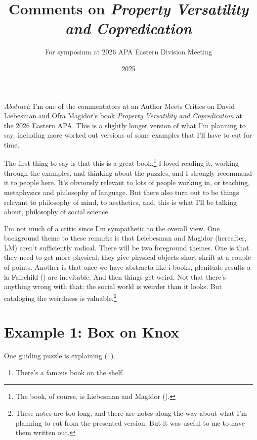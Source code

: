 \documentclass[
  11pt,
  letterpaper,
  DIV=11,
  numbers=noendperiod,
  twoside]{scrartcl}
\title{Comments on \emph{Property Versatility and Copredication}}
\subtitle{For symposium at 2026 APA Eastern Division Meeting}
\author{}
\date{2025}
\providecommand{\tightlist}{%
  \setlength{\itemsep}{0pt}\setlength{\parskip}{0pt}}
\renewenvironment{abstract}
 {\vspace{-1.25cm}
 \quotation\small\noindent\emph{Abstract}:}
 {\endquotation}
\renewenvironment{abstract}
 {\quotation\small\noindent\emph{Abstract}:}
 {\endquotation\vspace{-0.02cm}}
\begin{document}
\maketitle
\begin{abstract}
I'm one of the commentators at an Author Meets Critics on David
Liebesman and Ofra Magidor's book \emph{Property Versatility and
Copredication} at the 2026 Eastern APA. This is a slightly longer
version of what I'm planning to say, including more worked out versions
of some examples that I'll have to cut for time.
\end{abstract}


The first thing to say is that this is a great book.\footnote{The book,
  of course, is Liebesman and Magidor ().} I
loved reading it, working through the examples, and thinking about the
puzzles, and I strongly recommend it to people here. It's obviously
relevant to lots of people working in, or teaching, metaphysics and
philosophy of language. But there also turn out to be things relevant to
philosophy of mind, to aesthetics, and, this is what I'll be talking
about, philosophy of social science.

I'm not much of a critic since I'm sympathetic to the overall view. One
background theme to these remarks is that Leiebesman and Magidor
(hereafter, LM) aren't sufficiently radical. There will be two
foreground themes. One is that they need to get more physical; they give
physical objects short shrift at a couple of points. Another is that
once we have abstracta like i-books, plenitude results a la Fairchild
() are inevitable. And then things get
weird. Not that there's anything wrong with that; the social world is
weirder than it looks. But cataloging the weirdness is
valuable.\footnote{These notes are too long, and there are notes along
  the way about what I'm planning to cut from the presented version. But
  it was useful to me to have them written out.}

\section{Example 1: Box on Knox}\label{example-1-box-on-knox}

One guiding puzzle is explaining (1).

\begin{enumerate}
\def\labelenumi{(\arabic{enumi})}
\tightlist
\item
  There's a famous book on the shelf.
\end{enumerate}
\end{document}
